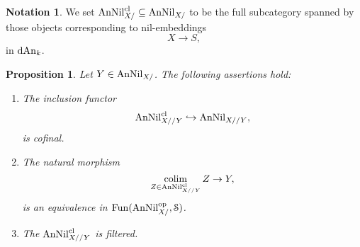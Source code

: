 \documentclass[10pt,a4paper,reqno]{amsart} %
\theoremstyle{plain}
\newtheorem{prop}[thm]{Proposition}
\theoremstyle{definition}
\newtheorem{notation}[thm]{Notation}
\theoremstyle{remark}
\numberwithin{equation}{section}
\begin{document}
\begin{notation}
    We set $\mathrm{AnNil}_{X/}^{\mathrm{cl}} \subseteq \mathrm{AnNil}_{X/}$ to be the full subcategory spanned by those objects corresponding to nil-embeddings
        \[
            X \to S,  
        \]
    in $\mathrm{dAn}_k$.
\end{notation}

\begin{prop} \label{prop:analytic_FMP_under_X_are_ind_inf_schemes}
    Let $Y \in \mathrm{AnNil}_{X/}$. The following assertions hold:
    \begin{enumerate}
        \item The inclusion functor
            \[
              \mathrm{AnNil}^{\mathrm{cl}}_{X//Y} \hookrightarrow \mathrm{AnNil}_{X//Y} , 
            \]
        is cofinal.
        \item The natural morphism
            \[
               \operatorname*{colim}_{Z \in \mathrm{AnNil}_{X//Y}^{\mathrm{cl}}} Z \to Y,  
            \]
        is an equivalence in $\operatorname{Fun}(\mathrm{AnNil}_{X/}^\mathrm{op}, \mathcal S)$.
        \item The \infcat $\mathrm{AnNil}_{X//Y}^{\mathrm{cl}}$ is filtered.
    \end{enumerate}
\end{prop}
\end{document}
